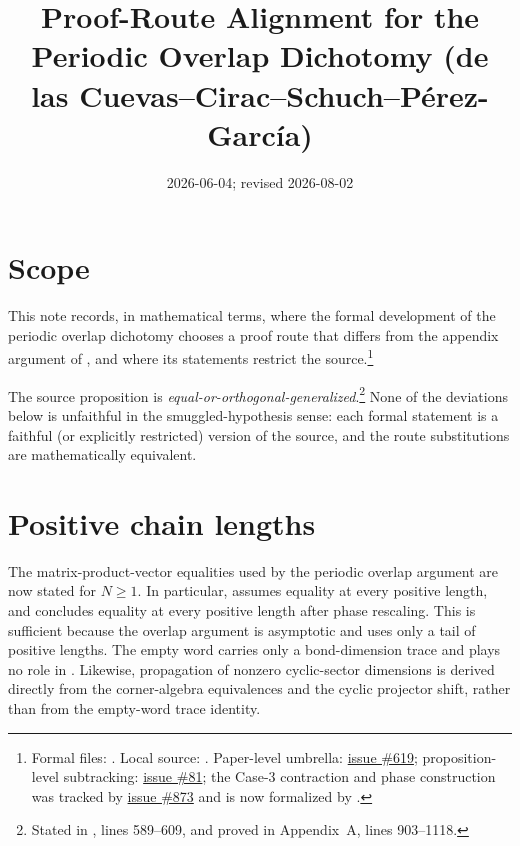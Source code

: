 \documentclass{article}
\title{Proof-Route Alignment for the Periodic Overlap Dichotomy
  (de las Cuevas--Cirac--Schuch--P\'erez-Garc\'ia)}
\author{}
\date{2026-06-04; revised 2026-08-02}
\begin{document}
\maketitle

\section{Scope}

This note records, in mathematical terms, where the formal development of the
periodic overlap dichotomy chooses a proof route that differs from the appendix
argument of \cite[Appendix~A]{DeLasCuevas2017Irreducible}, and where its
statements restrict the source.\footnote{Formal files:
. Local source:
. Paper-level umbrella:
\href{https://github.com/LionSR/TNLean/issues/619}{issue \#619}; proposition-level
subtracking: \href{https://github.com/LionSR/TNLean/issues/81}{issue \#81};
the Case-3 contraction and phase construction was tracked by
\href{https://github.com/LionSR/TNLean/issues/873}{issue \#873} and is now
formalized by .}

The source proposition is \emph{equal-or-orthogonal-generalized}.\footnote{Stated
in \cite{DeLasCuevas2017Irreducible}, lines 589--609, and proved in Appendix~A,
lines 903--1118.} None of the deviations below is unfaithful in the
smuggled-hypothesis sense: each formal statement is a faithful (or explicitly
restricted) version of the source, and the route substitutions are
mathematically equivalent.

\section{Positive chain lengths}

The matrix-product-vector equalities used by the periodic overlap argument are
now stated for $N\geq 1$.  In particular,
 assumes equality
at every positive length, and
 concludes equality at
every positive length after phase rescaling.  This is sufficient because the
overlap argument is asymptotic and uses only a tail of positive lengths.  The
empty word carries only a bond-dimension trace and plays no role in
\cite[theorem \texttt{thm:bd}, lines~613--623]{DeLasCuevas2017Irreducible}.
Likewise, propagation of nonzero cyclic-sector dimensions is derived directly
from the corner-algebra equivalences and the cyclic projector shift, rather
than from the empty-word trace identity.
\end{document}
